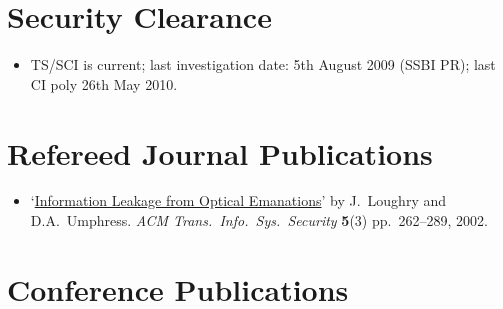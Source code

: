 \documentclass[letterpaper]{article}
\begin{document}
\section*{Security Clearance}

\begin{itemize}
	\item TS/SCI is current; last investigation date: 5th August 2009 (SSBI PR);
		last CI poly 26th May 2010.
\end{itemize}

\section*{Refereed Journal Publications}

\begin{itemize}
    \item `\href{http://dl.acm.org/citation.cfm?doid=545186.545189}{Information Leakage
	from Optical Emanations}' by J.\ Loughry and D.A.\ Umphress. \emph{ACM
	Trans.\ Info.\ Sys.\ Security} \textbf{5}(3) pp.\ 262--289, 2002.
\end{itemize}

\section*{Conference Publications}
\end{document}
